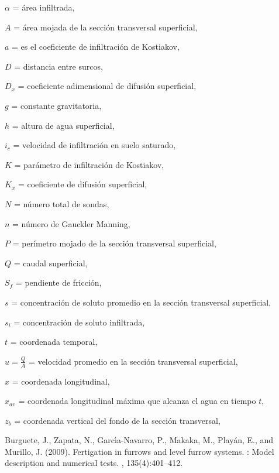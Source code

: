 \documentclass[a4paper,12pt]{report}
\begin{document}
\begin{description}
\item $\alpha$ = área infiltrada,
\item $A$ = área mojada de la sección transversal superficial,
\item $a$ = es el coeficiente de infiltración de Kostiakov,
\item $D$ = distancia entre surcos,
\item $D_x$ = coeficiente adimensional de difusión superficial,
\item $g$ = constante gravitatoria,
\item $h$ = altura de agua superficial,
\item $i_c$ = velocidad de infiltración en suelo saturado,
\item $K$ = parámetro de infiltración de Kostiakov, 
\item $K_x$ = coeficiente de difusión superficial,
\item $N$ = número total de sondas, 
\item $n$ = número de Gauckler Manning,
\item $P$ = perímetro mojado de la sección transversal superficial,
\item $Q$ = caudal superficial,
\item $S_f$ = pendiente de fricción,
\item $s$ = concentración de soluto promedio en la sección transversal superficial,
\item $s_i$ = concentración de soluto infiltrada,
\item $t$ = coordenada temporal,
\item $u=\frac{Q}{A}$ = velocidad promedio en la sección transversal superficial,
\item $x$ = coordenada longitudinal,
\item $x_{av}$ = coordenada longitudinal máxima que alcanza el agua en tiempo $t$,
\item $z_b$ = coordenada vertical del fondo de la sección transversal,
\end{description}

\clearpage
\begin{thebibliography}{}

Burguete, J., Zapata, N., Garc\'{\i}a-Navarro, P., Ma\protect{\"{\i}}kaka, M.,
  Play\'an, E., and Murillo, J. (2009).
\newblock Fertigation in furrows and level furrow systems. : Model
  description and numerical tests.
,
  135(4):401--412.

\end{thebibliography}
\end{document}
